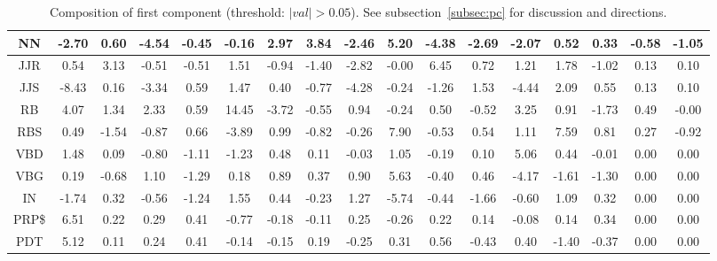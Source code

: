 \documentclass[%
 aip,
 jmp,%
 amsmath,amssymb,
 reprint,%
]{revtex4-1}
\begin{document}
\begin{table}
\begin{tabular}{|c|| c|c|c|c|| c|c|c|c|| c|c|c|c|| c|c|c|c|}
NN & -2.70 & 0.60 & -4.54 & -0.45 & -0.16 & 2.97 & 3.84 & -2.46 & 5.20 & -4.38 & -2.69 & -2.07 & 0.52 & 0.33 & -0.58 & -1.05 \\\hline
JJR & 0.54 & 3.13 & -0.51 & -0.51 & 1.51 & -0.94 & -1.40 & -2.82 & -0.00 & 6.45 & 0.72 & 1.21 & 1.78 & -1.02 & 0.13 & 0.10 \\\hline
JJS & -8.43 & 0.16 & -3.34 & 0.59 & 1.47 & 0.40 & -0.77 & -4.28 & -0.24 & -1.26 & 1.53 & -4.44 & 2.09 & 0.55 & 0.13 & 0.10 \\\hline
RB & 4.07 & 1.34 & 2.33 & 0.59 & 14.45 & -3.72 & -0.55 & 0.94 & -0.24 & 0.50 & -0.52 & 3.25 & 0.91 & -1.73 & 0.49 & -0.00 \\\hline
RBS & 0.49 & -1.54 & -0.87 & 0.66 & -3.89 & 0.99 & -0.82 & -0.26 & 7.90 & -0.53 & 0.54 & 1.11 & 7.59 & 0.81 & 0.27 & -0.92 \\\hline
VBD & 1.48 & 0.09 & -0.80 & -1.11 & -1.23 & 0.48 & 0.11 & -0.03 & 1.05 & -0.19 & 0.10 & 5.06 & 0.44 & -0.01 & 0.00 & 0.00 \\\hline
VBG & 0.19 & -0.68 & 1.10 & -1.29 & 0.18 & 0.89 & 0.37 & 0.90 & 5.63 & -0.40 & 0.46 & -4.17 & -1.61 & -1.30 & 0.00 & 0.00 \\\hline
IN & -1.74 & 0.32 & -0.56 & -1.24 & 1.55 & 0.44 & -0.23 & 1.27 & -5.74 & -0.44 & -1.66 & -0.60 & 1.09 & 0.32 & 0.00 & 0.00 \\\hline
PRP\$ & 6.51 & 0.22 & 0.29 & 0.41 & -0.77 & -0.18 & -0.11 & 0.25 & -0.26 & 0.22 & 0.14 & -0.08 & 0.14 & 0.34 & 0.00 & 0.00 \\\hline
PDT & 5.12 & 0.11 & 0.24 & 0.41 & -0.14 & -0.15 & 0.19 & -0.25 & 0.31 & 0.56 & -0.43 & 0.40 & -1.40 & -0.37 & 0.00 & 0.00 \\\hline
\end{tabular}
  \caption{Composition of first component (threshold: $|val|>0.05$). See subsection~\ref{subsec:pc} for discussion and directions.}\label{tab:pca1}
\end{table}
\end{document}

